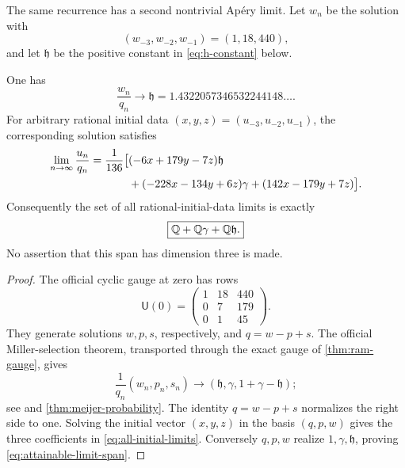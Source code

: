 The same recurrence has a second nontrivial Ap\'ery limit.  Let \(w_n\) be
the solution with
\begin{equation}\label{eq:w-initial}
 (w_{-3},w_{-2},w_{-1})=(1,18,440),
\end{equation}
and let \(\mathfrak h\) be the positive constant in
\eqref{eq:h-constant} below.

\begin{theorem}
\label{thm:ram-full-solution}
One has
\begin{equation}\label{eq:w-limit}
 \boxed{\displaystyle\frac{w_n}{q_n}\longrightarrow\mathfrak h
 =1.4322057346532244148\ldots.}
\end{equation}
For arbitrary rational initial data
\((x,y,z)=(u_{-3},u_{-2},u_{-1})\), the corresponding solution satisfies
\begin{align}
 \lim_{n\to\infty}\frac{u_n}{q_n}
 =\frac1{136}\bigl[&(-6x+179y-7z)\mathfrak h\notag\\
 &+(-228x-134y+6z)\gamma
 +(142x-179y+7z)\bigr].
 \label{eq:all-initial-limits}
\end{align}
Consequently the set of all rational-initial-data limits is exactly
\begin{equation}\label{eq:attainable-limit-span}
 \boxed{\mathbb Q+\mathbb Q\gamma+\mathbb Q\mathfrak h.}
\end{equation}
No assertion that this span has dimension three is made.
\end{theorem}

\begin{proof}
The official cyclic gauge at zero has rows
\begin{equation}\label{eq:U0-rows}
 \mathsf U(0)=
 \begin{pmatrix}1&18&440\\0&7&179\\0&1&45\end{pmatrix}.
\end{equation}
They generate solutions \(w,p,s\), respectively, and
\(q=w-p+s\).  The official Miller-selection theorem, transported through
the exact gauge of \cref{thm:ram-gauge}, gives
\begin{equation}\label{eq:Miller-limit-vector}
 \frac1{q_n}(w_n,p_n,s_n)
 \longrightarrow
 (\mathfrak h,\gamma,1+\gamma-\mathfrak h);
\end{equation}
see \cite[\S5.2]{RamanujanOfficial2026} and
\cref{thm:meijer-probability}.  The identity \(q=w-p+s\) normalizes the
right side to one.  Solving the initial vector
\((x,y,z)\) in the basis \((q,p,w)\) gives the three coefficients in
\eqref{eq:all-initial-limits}.  Conversely \(q,p,w\) realize
\(1,\gamma,\mathfrak h\), proving \eqref{eq:attainable-limit-span}.
\end{proof}

